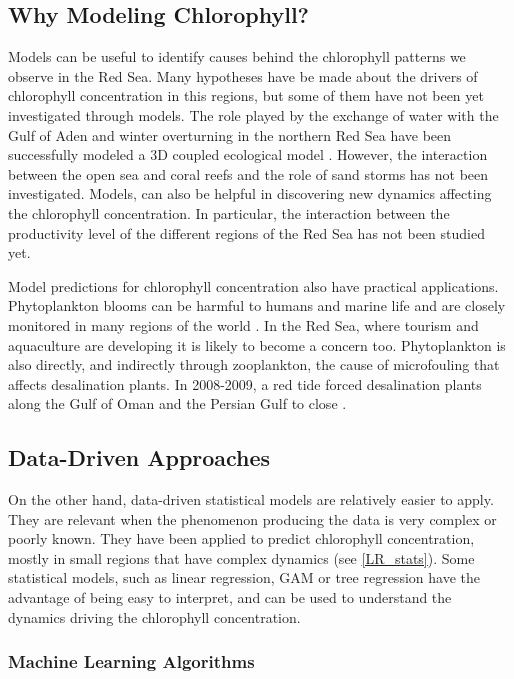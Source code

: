 \subsection{Why Modeling Chlorophyll?}

Models can be useful to identify causes behind the chlorophyll patterns we observe in the Red Sea. Many hypotheses have be made about the drivers of chlorophyll concentration in this regions, but some of them have not been yet investigated through models. The role played by the exchange of water with the Gulf of Aden and winter overturning in the northern Red Sea have been successfully modeled a 3D coupled ecological model \cite{Triantafyllou2014}. However, the interaction between the open sea and coral reefs and the role of sand storms has not been investigated. Models, can also be helpful in discovering new dynamics affecting the chlorophyll concentration. In particular, the interaction between the productivity level of the different regions of the Red Sea has not been studied yet.

Model predictions for chlorophyll concentration also have practical applications. Phytoplankton blooms can be harmful to humans and marine life and are closely monitored in many regions of the world \cite{Pettersson2013}. In the Red Sea, where tourism and aquaculture are developing it is likely to become a concern too. Phytoplankton is also directly, and indirectly through zooplankton, the cause of microfouling that affects desalination plants. In 2008-2009, a red tide forced desalination plants along the Gulf of Oman and the Persian Gulf to close \cite{Richlen2010}.

\subsection{Data-Driven Approaches}

On the other hand, data-driven statistical models are relatively easier to apply. They are relevant when the phenomenon producing the data is very complex or poorly known. They have been applied to predict chlorophyll concentration, mostly in small regions that have complex dynamics (see \ref{LR_stats}). Some statistical models, such as linear regression, GAM or tree regression have the advantage of being easy to interpret, and can be used to understand the dynamics driving the chlorophyll concentration.

\subsubsection{Machine Learning Algorithms}


